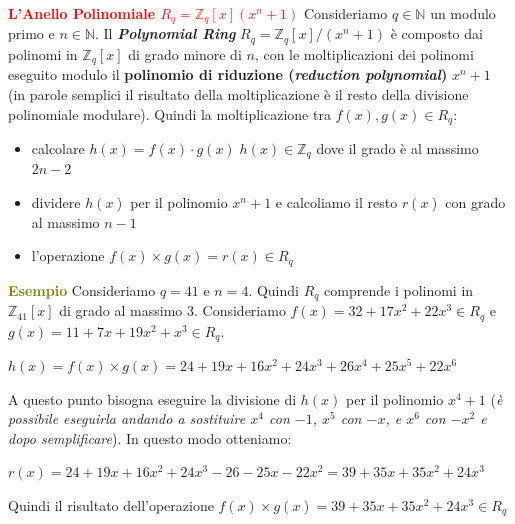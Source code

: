 \newpage

\begin{flushleft}
    \textcolor{red}{\textbf{L'Anello Polinomiale $R_q = \mathbb{Z}_q[x](x^n + 1)$}} \newline
    Consideriamo $q \in \mathbb{N}$ un modulo primo e $n \in \mathbb{N}$. Il \textbf{\textit{Polynomial Ring}} $R_q = \mathbb{Z}_q[x]/(x^n + 1)$ è composto dai polinomi in $\mathbb{Z}_q[x]$ di grado minore di $n$, con le moltiplicazioni dei polinomi eseguito modulo il \textbf{polinomio di riduzione (\textit{reduction polynomial})} $x^n + 1$ (in parole semplici il risultato della moltiplicazione è il resto della divisione polinomiale modulare). Quindi la moltiplicazione tra $f(x), g(x) \in R_q$:
    \begin{itemize}[nosep]
        \item calcolare $h(x) = f(x) \cdot g(x) \; h(x) \in \mathbb{Z}_q$ dove il grado è al massimo $2n - 2$
        \item dividere $h(x)$ per il polinomio $x^n + 1$ e calcoliamo il resto $r(x)$ con grado al massimo $n - 1$
        \item l'operazione $f(x) \times g(x) = r(x) \in R_q$
    \end{itemize}

    \begin{boxA}
        \textcolor{olive}{\textbf{Esempio}} \newline
        Consideriamo $q = 41$ e $n = 4$. Quindi $R_q$ comprende i polinomi in $\mathbb{Z}_{41}[x]$ di grado al massimo 3. Consideriamo $f(x) = 32 + 17x^2 + 22x^3 \in R_q$ e $g(x) = 11 + 7x + 19x^2 + x^3 \in R_q$.

        {\centering
            $h(x) = f(x) \times g(x) = 24 + 19x + 16x^2 + 24x^3 + 26x^4 + 25x^5 + 22x^6$
        \par}

        A questo punto bisogna eseguire la divisione di $h(x)$ per il polinomio $x^4 + 1$ (\textit{è possibile eseguirla andando a sostituire $x^4$ con $-1$, $x^5$ con $-x$, e $x^6$ con $-x^2$ e dopo semplificare}). In questo modo otteniamo:

        {\centering
            $r(x) = 24 + 19x + 16x^2 + 24x^3 - 26 - 25x - 22x^2 = 39 + 35x + 35x^2 + 24x^3$
        \par}

        Quindi il risultato dell'operazione $f(x) \times g(x) = 39 + 35x + 35x^2 + 24x^3 \in R_q$
    \end{boxA}
\end{flushleft}

